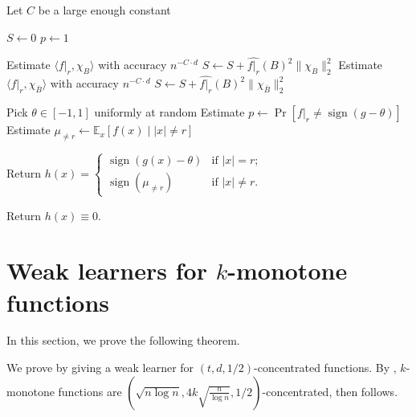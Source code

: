\documentclass{toc}
\newcommand{\Braket}[1]{\langle#1\rangle}
\begin{document}
%
\begin{algorithm}[t]
\caption{A weak learner for $(t,d, 1/2)$-concentrated functions}
\label{alg:learner}
  Let $C$ be a large enough constant\;
 {
     $S\leftarrow 0$\;
     $p\leftarrow 1$\;
     {
        {
            Estimate $\Braket{f|_r, \chi_B}$ with accuracy $n^{-C\cdot d}$\;
            $S\leftarrow S+\widehat{f|_r}(B)^2\| \chi_B\|_2^2$\;
        }\Else
        {
            Estimate $\Braket{f|_r, \chi_{\bar{B}}}$ with accuracy $n^{-C\cdot d}$\;
            $S\leftarrow S+\widehat{f|_r}(B)^2\| \chi_{\bar{B}}\|_2^2$\;
        }
          
     }
       {

        {
            Pick $\theta \in [-1,1]$ uniformly at random\;
            Estimate $p\leftarrow\Pr[f|_r\neq\operatorname{sign}(g-\theta)]$\;
        }
        Estimate $\mu_{\neq r}\leftarrow \mathbb{E}_{x}[f(x)\mid |x|\neq r]$\;

        Return $h(x)=\begin{cases}
                         \operatorname{sign}(g(x)-\theta) & \mbox{if } |x|=r;\\
                        \operatorname{sign}(\mu_{\neq r}) & \mbox{if } |x|\neq r.
                     \end{cases}$
        }
  
 }
 Return $h(x)\equiv 0$.
\end{algorithm}

\section{Weak learners for $k$-monotone functions}
In this section, we prove the following theorem.

\learner*

We prove  by giving a weak learner for $(t,d,1/2)$-concentrated functions. By , $k$-monotone functions are $\left(\sqrt{n\log n},4k\sqrt{\frac{n}{\log n}},1/2\right)$-concentrated, then  follows.
\end{document}
